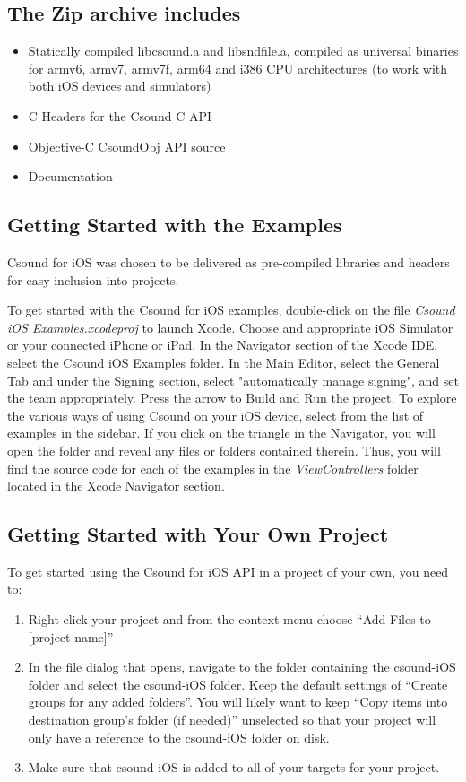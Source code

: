 \documentclass[11pt]{article}
\begin{document}
\subsection{The Zip archive includes}

\begin{itemize}
\item Statically compiled libcsound.a and libsndfile.a, compiled as universal binaries for armv6, armv7, armv7f, arm64 and i386 CPU architectures (to work with both iOS devices and simulators)
\item C Headers for the Csound C API
\item Objective-C CsoundObj API source
\item Documentation
\end{itemize}

\subsection{Getting Started with the Examples}

Csound for iOS was chosen to be delivered as pre-compiled libraries and headers for easy inclusion into projects.  

To get started with the Csound for iOS examples, double-click on the file \textit{Csound iOS Examples.xcodeproj} to launch Xcode. Choose and appropriate iOS Simulator or your connected iPhone or iPad. In the Navigator section of the Xcode IDE, select the Csound iOS Examples folder.  In the Main Editor, select the General Tab and under the Signing section, select "automatically manage signing", and set the team appropriately.  Press the arrow to Build and Run the project.  To explore the various ways of using Csound on your iOS device, select from the list of examples in the sidebar. If you click on the triangle in the Navigator, you will open the folder and reveal any files or folders contained therein. Thus, you will find the source code for each of the examples in the \textit{ViewControllers} folder located in the Xcode Navigator section.

\subsection{Getting Started with Your Own Project}

To get started using the Csound for iOS API in a project of your own, you need to:
 
\begin{enumerate}
\item Right-click your project and from the context menu choose ``Add Files to [project name]''
\item In the file dialog that opens, navigate to the folder containing the csound-iOS folder and select the csound-iOS folder. Keep the default settings of ``Create groups for any added folders''.  You will likely want to keep ``Copy items into destination group's folder (if needed)'' unselected so that your project will only have a reference to the csound-iOS folder on disk.
\item Make sure that csound-iOS is added to all of your targets for your project.
\end{enumerate}
\end{document}
